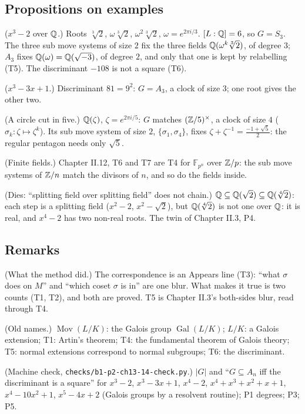 \subsection*{Propositions on examples}

\begin{lines}
\item[\lab{P1}] ($x^3 - 2$ over $\mathbb{Q}$.) Roots $\sqrt[3]{2}$, $\omega\sqrt[3]{2}$, $\omega^2\sqrt[3]{2}$, $\omega = e^{2\pi i/3}$. $[L : \mathbb{Q}] = 6$, so $G = S_3$. The three sub move systems of size $2$ fix the three fields $\mathbb{Q}(\omega^k \sqrt[3]{2})$, of degree $3$; $A_3$ fixes $\mathbb{Q}(\omega) = \mathbb{Q}(\sqrt{-3})$, of degree $2$, and only that one is kept by relabelling (T5). The discriminant $-108$ is not a square (T6).
\item[\lab{P2}] ($x^3 - 3x + 1$.) Discriminant $81 = 9^2$: $G = A_3$, a clock of size $3$; one root gives the other two.
\item[\lab{P3}] (A circle cut in five.) $\mathbb{Q}(\zeta)$, $\zeta = e^{2\pi i/5}$: $G$ matches $(\mathbb{Z}/5)^\times$, a clock of size $4$ ($\sigma_k : \zeta \mapsto \zeta^k$). Its sub move system of size $2$, $\{\sigma_1, \sigma_4\}$, fixes $\zeta + \zeta^{-1} = \tfrac{-1 + \sqrt5}{2}$: the regular pentagon needs only $\sqrt5$.
\item[\lab{P4}] (Finite fields.) Chapter II.12, T6 and T7 are T4 for $\mathbb{F}_{p^n}$ over $\mathbb{Z}/p$: the sub move systems of $\mathbb{Z}/n$ match the divisors of $n$, and so do the fields inside.
\item[\lab{P5}] (Dies: ``splitting field over splitting field'' does not chain.) $\mathbb{Q} \subseteq \mathbb{Q}(\sqrt2) \subseteq \mathbb{Q}(\sqrt[4]{2})$: each step is a splitting field ($x^2 - 2$, $x^2 - \sqrt2$), but $\mathbb{Q}(\sqrt[4]{2})$ is not one over $\mathbb{Q}$: it is real, and $x^4 - 2$ has two non-real roots. The twin of Chapter II.3, P4.
\end{lines}

\subsection*{Remarks}

\begin{lines}
\item[\lab{R1}] (What the method did.) The correspondence is an Appears line (T3): ``what $\sigma$ does on $M$'' and ``which coset $\sigma$ is in'' are one blur. What makes it true is two counts (T1, T2), and both are proved. T5 is Chapter II.3's both-sides blur, read through T4.
\item[\lab{R2}] (Old names.) $\operatorname{Mov}(L/K)$: the Galois group $\operatorname{Gal}(L/K)$; $L/K$: a Galois extension; T1: Artin's theorem; T4: the fundamental theorem of Galois theory; T5: normal extensions correspond to normal subgroups; T6: the discriminant.
\item[\lab{R3}] (Machine check, \texttt{checks/b1-p2-ch13-14-check.py}.) $|G|$ and ``$G \subseteq A_n$ iff the discriminant is a square'' for $x^3 - 2$, $x^3 - 3x + 1$, $x^4 - 2$, $x^4 + x^3 + x^2 + x + 1$, $x^4 - 10x^2 + 1$, $x^5 - 4x + 2$ (Galois groups by a resolvent routine); P1 degrees; P3; P5.
\end{lines}


